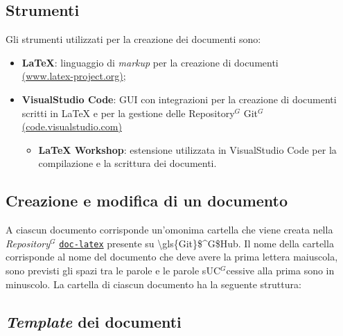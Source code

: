 \subsection{Strumenti}
Gli strumenti utilizzati per la creazione dei documenti sono:
\begin{itemize}
	\item \textbf{LaTeX}: linguaggio di \textit{markup} per la creazione di documenti \\
	      \href{https://www.latex-project.org/}{(www.latex-project.org)};
	\item \textbf{VisualStudio Code}: GUI con integrazioni per la creazione di documenti scritti in LaTeX e per la gestione delle \gls{Repository}$^G$ \gls{Git}$^G$ \\
	      \href{https://code.visualstudio.com/}{(code.visualstudio.com)}
	      \begin{itemize}
		      \item \textbf{LaTeX Workshop}: estensione utilizzata in VisualStudio Code per la compilazione e la scrittura dei documenti.
	      \end{itemize}
\end{itemize}


\subsection{Creazione e modifica di un documento}

A ciascun documento corrisponde un'omonima cartella che viene creata nella
\textit{\gls{Repository}$^G$}
\href{https://\gls{\gls{Git}$^G$Hub}.com/Project-SWEnergy/doc-latex}{\texttt{doc-latex}}
presente su \gls{\gls{Git}$^G$Hub}. Il nome della cartella corrisponde al nome del documento che
deve avere la prima lettera maiuscola, sono previsti gli spazi tra le parole e
le parole s\gls{UC}$^G$cessive alla prima sono in minuscolo.
La cartella di ciascun documento ha la seguente struttura:


\subsection{\textit{Template} dei documenti}

